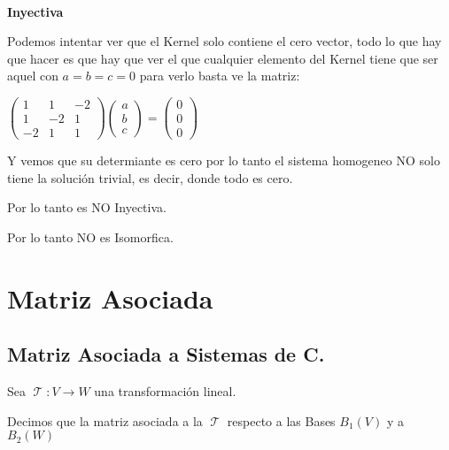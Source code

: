 \documentclass[12pt]{report}                                    %
\DeclareMathOperator \LinealTransformation {\mathcal{T}}        %
\begin{document}
            \textbf{\\Inyectiva}

            Podemos intentar ver que el Kernel solo contiene el cero vector, todo lo que hay que hacer es
            que hay que ver el que cualquier elemento del Kernel tiene que ser aquel con $a=b=c=0$
            para verlo basta ve la matriz:

            $\begin{pmatrix}1&1&-2\\1&-2&1\\-2&1&1\end{pmatrix} \begin{pmatrix}a\\b\\c\end{pmatrix}=
                \begin{pmatrix}0\\0\\0\end{pmatrix}$

            Y vemos que su determiante es cero por lo tanto el sistema homogeneo NO solo
            tiene la solución trivial, es decir, donde todo es cero.

            Por lo tanto es NO Inyectiva.

            Por lo tanto NO es Isomorfica.




\chapter{Matriz Asociada}

    \clearpage
    \section{Matriz Asociada a Sistemas de C.}
        Sea $\LinealTransformation : V \to W $ una transformación lineal.
        
        Decimos que la matriz asociada a la $\LinealTransformation$ respecto a las Bases 
        $B_{1}(V)$ y a $B_{2}(W)$
\end{document}
